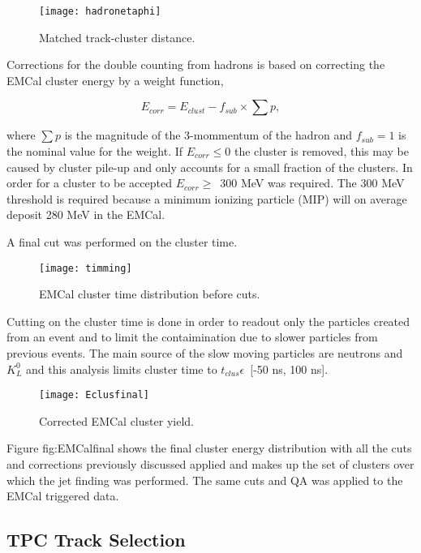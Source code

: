 \begin{figure}[h]
\texttt{[image: hadronetaphi]}
\centering
\caption{Matched track-cluster distance.}
\label{fig:EMChadetaphi}
\end{figure}

\noindent
Corrections for the double counting from hadrons is based on correcting the EMCal cluster energy by a weight function,

\begin{equation}
E_{corr} = E_{clust} - f_{sub} \times \sum p ,
\label{eq:HadCorr}
\end{equation}

\noindent
where $\sum p$ is the magnitude of the 3-mommentum of the hadron and $f_{sub} = 1$ is the nominal value for the weight.  If $E_{corr} \leq 0$ the cluster is removed, this may be caused by cluster pile-up and only accounts for a small fraction of the clusters.  In order for a cluster to be accepted $E_{corr} \geq \,$ 300 MeV was required.  The 300 MeV threshold is required because a minimum ionizing particle (MIP) will on average deposit 280 MeV in the EMCal.  

A final cut was performed on the cluster time.  
\begin{figure}[h]
\texttt{[image: timming]}
\centering
\caption{EMCal cluster time distribution before cuts.}
\label{fig:EMCaltime}
\end{figure}

\noindent
Cutting on the cluster time is done in order to readout only the particles created from an event and to limit the contaimination due to slower particles from previous events.  The main source of the slow moving particles are neutrons and $K_{L}^{0}$ and this analysis limits cluster time to $t_{clus} \epsilon \,$ [-50 ns, 100 ns].


\begin{figure}[h]
\texttt{[image: Eclusfinal]}
\centering
\caption{Corrected EMCal cluster yield.}
\label{fig:EMCalfinal}
\end{figure}
\newpage

Figure {fig:EMCalfinal} shows the final cluster energy distribution with all the cuts and corrections previously discussed applied and makes up the set of clusters over which the jet finding was performed.  The same cuts and QA was applied to the EMCal triggered data.
 
\subsection{TPC Track Selection}

